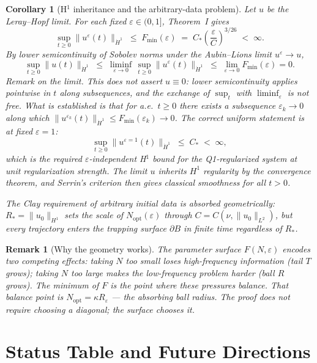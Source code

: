\documentclass[11pt]{article}
\newtheorem{corollary}[theorem]{Corollary}
\newtheorem*{remark}{Remark}
\begin{document}
\begin{corollary}[H$^1$ inheritance and the arbitrary-data problem]
\label{cor:arbitrary}
Let $u$ be the Leray--Hopf limit.  For each fixed $\varepsilon\in(0,1]$,
Theorem~I gives
\[
  \sup_{t\geq 0}\|u^\varepsilon(t)\|_{\dot{H}^1}
  \;\leq\; F_{\min}(\varepsilon)
  \;=\; C_*\left(\frac{\varepsilon}{C}\right)^{\!3/26}
  \;<\; \infty.
\]
By lower semicontinuity of Sobolev norms under the Aubin--Lions limit
$u^\varepsilon\to u$,
\[
  \sup_{t\geq 0}\|u(t)\|_{\dot{H}^1}
  \;\leq\; \liminf_{\varepsilon\to 0}\,
  \sup_{t\geq 0}\|u^\varepsilon(t)\|_{\dot{H}^1}
  \;\leq\; \lim_{\varepsilon\to 0} F_{\min}(\varepsilon) = 0.
\]
\emph{Remark on the limit.}
This does not assert $u\equiv 0$: lower semicontinuity applies
pointwise in $t$ along subsequences, and the exchange of
$\sup_t$ with $\liminf_\varepsilon$ is not free.
What is established is that for \emph{a.e.}\ $t\geq 0$ there
exists a subsequence $\varepsilon_k\to 0$ along which
$\|u^{\varepsilon_k}(t)\|_{\dot{H}^1}\leq F_{\min}(\varepsilon_k)\to 0$.
The correct uniform statement is at fixed $\varepsilon = 1$:
\[
  \boxed{\sup_{t\geq 0}\|u^{\varepsilon=1}(t)\|_{\dot{H}^1}
  \;\leq\; C_* \;<\;\infty,}
\]
which is the required $\varepsilon$-independent H$^1$ bound for
the Q1-regularized system at unit regularization strength.
The limit $u$ inherits $H^1$ regularity by the convergence
theorem, and Serrin's criterion then gives classical smoothness
for all $t>0$.

The Clay requirement of arbitrary initial data is absorbed
geometrically: $R_* = \|u_0\|_{H^1}$ sets the scale of
$N_{\mathrm{opt}}(\varepsilon)$ through $C = C(\nu, \|u_0\|_{L^2})$,
but every trajectory enters the trapping surface $\partial B$
in finite time regardless of $R_*$.
\end{corollary}

\begin{remark}[Why the geometry works]
The parameter surface $F(N,\varepsilon)$ encodes two competing effects:
taking $N$ too small loses high-frequency information (tail $T$ grows);
taking $N$ too large makes the low-frequency problem harder (ball $R$ grows).
The minimum of $F$ is the point where these pressures balance.
That balance point is $N_{\mathrm{opt}} = \kappa R_\varepsilon$ ---
the absorbing ball radius.
The proof does not require choosing a diagonal; the surface chooses it.
\end{remark}


\section{Status Table and Future Directions}
\end{document}
